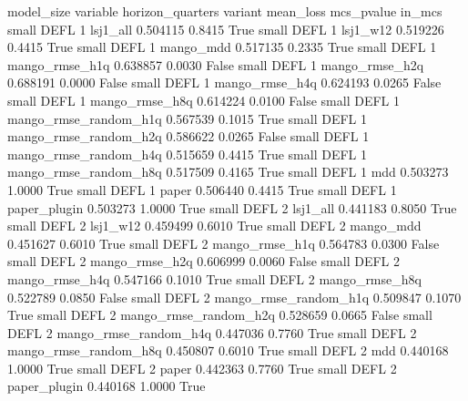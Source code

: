 model_size variable  horizon_quarters               variant  mean_loss  mcs_pvalue  in_mcs
     small     DEFL                 1              lsj1_all   0.504115      0.8415    True
     small     DEFL                 1              lsj1_w12   0.519226      0.4415    True
     small     DEFL                 1             mango_mdd   0.517135      0.2335    True
     small     DEFL                 1        mango_rmse_h1q   0.638857      0.0030   False
     small     DEFL                 1        mango_rmse_h2q   0.688191      0.0000   False
     small     DEFL                 1        mango_rmse_h4q   0.624193      0.0265   False
     small     DEFL                 1        mango_rmse_h8q   0.614224      0.0100   False
     small     DEFL                 1 mango_rmse_random_h1q   0.567539      0.1015    True
     small     DEFL                 1 mango_rmse_random_h2q   0.586622      0.0265   False
     small     DEFL                 1 mango_rmse_random_h4q   0.515659      0.4415    True
     small     DEFL                 1 mango_rmse_random_h8q   0.517509      0.4165    True
     small     DEFL                 1                   mdd   0.503273      1.0000    True
     small     DEFL                 1                 paper   0.506440      0.4415    True
     small     DEFL                 1          paper_plugin   0.503273      1.0000    True
     small     DEFL                 2              lsj1_all   0.441183      0.8050    True
     small     DEFL                 2              lsj1_w12   0.459499      0.6010    True
     small     DEFL                 2             mango_mdd   0.451627      0.6010    True
     small     DEFL                 2        mango_rmse_h1q   0.564783      0.0300   False
     small     DEFL                 2        mango_rmse_h2q   0.606999      0.0060   False
     small     DEFL                 2        mango_rmse_h4q   0.547166      0.1010    True
     small     DEFL                 2        mango_rmse_h8q   0.522789      0.0850   False
     small     DEFL                 2 mango_rmse_random_h1q   0.509847      0.1070    True
     small     DEFL                 2 mango_rmse_random_h2q   0.528659      0.0665   False
     small     DEFL                 2 mango_rmse_random_h4q   0.447036      0.7760    True
     small     DEFL                 2 mango_rmse_random_h8q   0.450807      0.6010    True
     small     DEFL                 2                   mdd   0.440168      1.0000    True
     small     DEFL                 2                 paper   0.442363      0.7760    True
     small     DEFL                 2          paper_plugin   0.440168      1.0000    True
